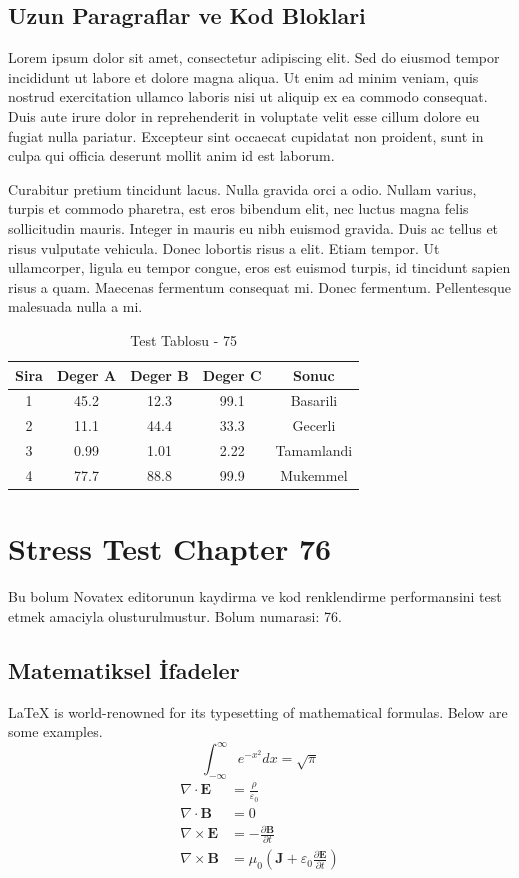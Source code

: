 \documentclass[12pt,a4paper]{article}
\begin{document}
\subsection{Uzun Paragraflar ve Kod Bloklari}
Lorem ipsum dolor sit amet, consectetur adipiscing elit. Sed do eiusmod tempor incididunt ut labore et dolore magna aliqua. Ut enim ad minim veniam, quis nostrud exercitation ullamco laboris nisi ut aliquip ex ea commodo consequat. Duis aute irure dolor in reprehenderit in voluptate velit esse cillum dolore eu fugiat nulla pariatur. Excepteur sint occaecat cupidatat non proident, sunt in culpa qui officia deserunt mollit anim id est laborum.

Curabitur pretium tincidunt lacus. Nulla gravida orci a odio. Nullam varius, turpis et commodo pharetra, est eros bibendum elit, nec luctus magna felis sollicitudin mauris. Integer in mauris eu nibh euismod gravida. Duis ac tellus et risus vulputate vehicula. Donec lobortis risus a elit. Etiam tempor. Ut ullamcorper, ligula eu tempor congue, eros est euismod turpis, id tincidunt sapien risus a quam. Maecenas fermentum consequat mi. Donec fermentum. Pellentesque malesuada nulla a mi.

\begin{table}[h!]
\centering
\begin{tabular}{|c|c|c|c|c|}
\hline
\textbf{Sira} & \textbf{Deger A} & \textbf{Deger B} & \textbf{Deger C} & \textbf{Sonuc} \\
\hline
1 & 45.2 & 12.3 & 99.1 & Basarili \\
2 & 11.1 & 44.4 & 33.3 & Gecerli \\
3 & 0.99 & 1.01 & 2.22 & Tamamlandi \\
4 & 77.7 & 88.8 & 99.9 & Mukemmel \\
\hline
\end{tabular}
\caption{Test Tablosu - 75}
\end{table}

\newpage
\section{Stress Test Chapter 76}
Bu bolum Novatex editorunun kaydirma ve kod renklendirme performansini test etmek amaciyla olusturulmustur. Bolum numarasi: 76.

\subsection{Matematiksel İfadeler}
\LaTeX{} is world-renowned for its typesetting of mathematical formulas. Below are some examples.
\begin{equation}
\int_{-\infty}^{\infty} e^{-x^2} dx = \sqrt{\pi}
\end{equation}
\begin{align}
\nabla \cdot \mathbf{E} &= \frac{\rho}{\varepsilon_0} \\
\nabla \cdot \mathbf{B} &= 0 \\
\nabla \times \mathbf{E} &= -\frac{\partial \mathbf{B}}{\partial t} \\
\nabla \times \mathbf{B} &= \mu_0\left(\mathbf{J} + \varepsilon_0 \frac{\partial \mathbf{E}}{\partial t}\right)
\end{align}
\end{document}
